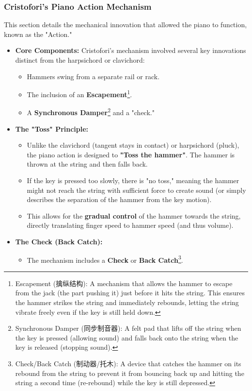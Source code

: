 \documentclass[math,code]{amznotes}
\theoremstyle{remark}
\begin{document}
\subsubsection{Cristofori's Piano Action Mechanism}

This section details the mechanical innovation that allowed the piano to function, known as the "Action."

\begin{itemize}
    \item \textbf{Core Components:} Cristofori's mechanism involved several key innovations distinct from the harpsichord or clavichord:
    \begin{itemize}
        \item Hammers swing from a separate rail or rack.
        \item The inclusion of an \textbf{Escapement}\footnote{Escapement (擒纵结构): A mechanism that allows the hammer to escape from the jack (the part pushing it) just before it hits the string. This ensures the hammer strikes the string and immediately rebounds, letting the string vibrate freely even if the key is still held down.}.
        \item A \textbf{Synchronous Damper}\footnote{Synchronous Damper (同步制音器): A felt pad that lifts off the string when the key is pressed (allowing sound) and falls back onto the string when the key is released (stopping sound).} and a "check."
    \end{itemize}
    \item \textbf{The "Toss" Principle:}
    \begin{itemize}
        \item Unlike the clavichord (tangent stays in contact) or harpsichord (pluck), the piano action is designed to \textbf{"Toss the hammer"}. The hammer is thrown at the string and then falls back.
        \item If the key is pressed too slowly, there is "no toss," meaning the hammer might not reach the string with sufficient force to create sound (or simply describes the separation of the hammer from the key motion).
        \item This allows for the \textbf{gradual control} of the hammer towards the string, directly translating finger speed to hammer speed (and thus volume).
    \end{itemize}
    \item \textbf{The Check (Back Catch):}
    \begin{itemize}
        \item The mechanism includes a \textbf{Check} or \textbf{Back Catch}\footnote{Check/Back Catch (制动器/托木): A device that catches the hammer on its rebound from the string to prevent it from bouncing back up and hitting the string a second time (re-rebound) while the key is still depressed.}.

\end{itemize}
\end{itemize}
\end{document}

